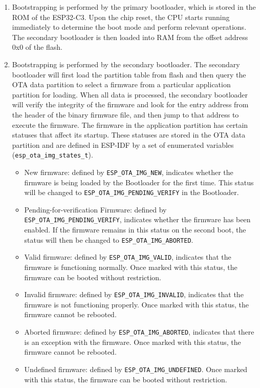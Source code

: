 \documentclass[a4paper,12pt,openany]{book}
\begin{document}
\begin{enumerate}[label=(\arabic*)]
    \item Bootstrapping is performed by the primary bootloader, which is stored in the ROM of the ESP32-C3. Upon the chip reset, the CPU starts running immediately to determine the boot mode and perform relevant operations. The secondary bootloader is then loaded into RAM from the offset address 0x0 of the flash.
    \item Bootstrapping is performed by the secondary bootloader. The secondary bootloader will first load the partition table from flash and then query the OTA data partition to select a firmware from a particular application partition for loading. When all data is processed, the secondary bootloader will verify the integrity of the firmware and look for the entry address from the header of the binary firmware file, and then jump to that address to execute the firmware. The firmware in the application partition has certain statuses that affect its startup. These statuses are stored in the OTA data partition and are defined in ESP-IDF by a set of enumerated variables (\verb|esp_ota_img_states_t|).
    \begin{itemize}[leftmargin=1em]
        \item New firmware: defined by \verb|ESP_OTA_IMG_NEW|, indicates whether the firmware is being loaded by the Bootloader for the first time. This status will be changed to \verb|ESP_OTA_IMG_PENDING_VERIFY| in the Bootloader.
        \item Pending-for-verification Firmware: defined by \verb|ESP_OTA_IMG_PENDING_VERIFY|, indicates whether the firmware has been enabled. If the firmware remains in this status on the second boot, the status will then be changed to \verb|ESP_OTA_IMG_ABORTED|.
        \item Valid firmware: defined by \verb|ESP_OTA_IMG_VALID|, indicates that the firmware is functioning normally. Once marked with this status, the firmware can be booted without restriction.
        \item Invalid firmware: defined by \verb|ESP_OTA_IMG_INVALID|, indicates that the firmware is not functioning properly. Once marked with this status, the firmware cannot be rebooted.
        \item Aborted firmware: defined by \verb|ESP_OTA_IMG_ABORTED|, indicates that there is an exception with the firmware. Once marked with this status, the firmware cannot be rebooted.
        \item Undefined firmware: defined by \verb|ESP_OTA_IMG_UNDEFINED|. Once marked with this status, the firmware can be booted without restriction.

\end{itemize}
\end{enumerate}
\end{document}
